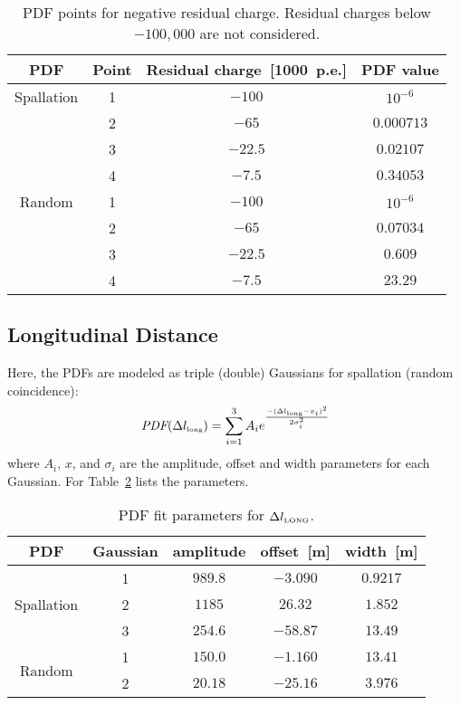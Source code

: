 \begin{table}[hbt]
\centering
\caption{PDF points for negative residual charge. Residual charges below $-100,000$ are not considered.}
\begin{tabular}{cccc}
\toprule
PDF & Point & Residual charge~[1000~p.e.] & PDF value\\
\hline
Spallation & 1 &  $-100$   & $10^{-6}$ \\
           & 2 &   $-65$   & $0.000713$ \\
           & 3 &   $-22.5$ & $0.02107$  \\
           & 4 &   $-7.5$ & $0.34053$   \\
\hline
Random     & 1 &  $-100$   & $10^{-6}$\\
           & 2 &   $-65$   & $0.07034$ \\
           & 3 &   $-22.5$ & $0.609$   \\
           & 4 &   $-7.5$  & $23.29$  \\
\bottomrule        %
\end{tabular}
\label{tab:fitnegresq}
\end{table}

\subsection{Longitudinal Distance}

Here, the PDFs are modeled as triple (double) Gaussians for spallation (random coincidence):
\begin{equation}
\mbox{\it PDF}(\Delta l_{\mbox{\tiny long}}) = \sum^3_{i=1} A_ie^{\frac{-(\Delta l_{\mbox{\tiny long}} - x_i)^2}{2\sigma_i^2}}
\end{equation}
where $A_i$, $x$, and $\sigma_i$ are the amplitude, offset and width parameters for each Gaussian. For Table~\ref{tab:fitsigln} lists the parameters.

\begin{table}[h]
\centering
\caption{PDF fit parameters for $\Delta l_{\mbox{\tiny LONG}}$.}
\begin{tabular}{ccccc}
\toprule
PDF & Gaussian & amplitude & offset~[m] & width~[m] \\
\hline

           & 1 & $989.8$ & $-3.090$ & $0.9217$ \\
Spallation & 2 & $1185$  &  $26.32$ & $1.852$  \\
           & 3 & $254.6$ & $-58.87$ & $13.49$  \\
\hline
\multirow{2}{*}{Random} &
             1 & $150.0$ & $-1.160$ & $13.41$  \\
           & 2 & $20.18$ & $-25.16$ & $3.976$ \\
\bottomrule        %
\end{tabular}
\label{tab:fitsigln}
\end{table}
